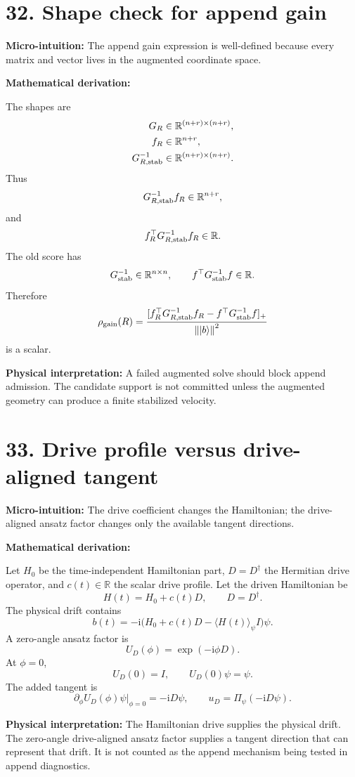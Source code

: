 \documentclass[10pt,twocolumn]{article}
\newcommand{\ii}{\mathrm{i}}
\newcommand{\ket}[1]{\left|#1\right\rangle}
\newcommand{\norm}[1]{\left\lVert #1\right\rVert}
\newcommand{\R}{\mathbb R}
\newcommand{\Id}{I}
\newcommand{\micro}[1]{%
  \par\smallskip
  \noindent\textcolor{deepblue}{\textbf{Micro-intuition:}} #1
  \par\smallskip}
\newcommand{\deriv}{%
  \par\noindent\textcolor{deepviolet}{\textbf{Mathematical derivation:}}\par\vspace{-1mm}}
\newcommand{\phys}[1]{%
  \par\smallskip
  \noindent\textcolor{deepgreen}{\textbf{Physical interpretation:}} #1
  \par\smallskip}
\begin{document}
\section*{32. Shape check for append gain}

\micro{The append gain expression is well-defined because every matrix and
vector lives in the augmented coordinate space.}

\deriv
The shapes are
\[
\begin{aligned}
G_R&\in\R^{(n+r)\times(n+r)},\\
f_R&\in\R^{n+r},\\
G_{R,{\rm stab}}^{-1}&\in\R^{(n+r)\times(n+r)}.
\end{aligned}
\]
Thus
\[
G_{R,{\rm stab}}^{-1}f_R\in\R^{n+r},
\]
and
\[
f_R^\top G_{R,{\rm stab}}^{-1}f_R\in\R.
\]
The old score has
\[
G_{\rm stab}^{-1}\in\R^{n\times n},
\qquad
f^\top G_{\rm stab}^{-1}f\in\R.
\]
Therefore
\[
\rho_{\rm gain}(R)
=
\frac{[f_R^\top G_{R,{\rm stab}}^{-1}f_R-f^\top G_{\rm stab}^{-1}f]_+}
{\norm{\ket b}^2}
\]
is a scalar.

\phys{A failed augmented solve should block append admission. The candidate
support is not committed unless the augmented geometry can produce a finite
stabilized velocity.}

\section*{33. Drive profile versus drive-aligned tangent}

\micro{The drive coefficient changes the Hamiltonian; the drive-aligned ansatz
factor changes only the available tangent directions.}

\deriv
Let \(H_0\) be the time-independent Hamiltonian part, \(D=D^\dagger\) the
Hermitian drive operator, and \(c(t)\in\R\) the scalar drive profile. Let the
driven Hamiltonian be
\[
H(t)=H_0+c(t)D,
\qquad
D=D^\dagger.
\]
The physical drift contains
\[
b(t)
=-\ii\bigl(H_0+c(t)D-\langle H(t)\rangle_\psi\Id\bigr)\psi.
\]
A zero-angle ansatz factor is
\[
U_D(\phi)=\exp(-\ii\phi D).
\]
At \(\phi=0\),
\[
U_D(0)=\Id,
\qquad
U_D(0)\psi=\psi.
\]
The added tangent is
\[
\partial_\phi U_D(\phi)\psi\big|_{\phi=0}
=-\ii D\psi,
\qquad
u_D=\Pi_\psi(-\ii D\psi).
\]

\phys{The Hamiltonian drive supplies the physical drift. The zero-angle
drive-aligned ansatz factor supplies a tangent direction that can represent that
drift. It is not counted as the append mechanism being tested in append
diagnostics.}
\end{document}
